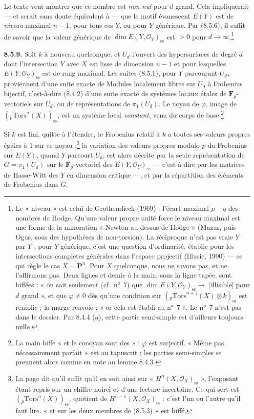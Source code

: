 \documentclass[11pt,a4paper]{article}
\begin{document}
Le texte veut montrer que ce nombre est \emph{non nul} pour $d$ grand. Cela
impliquerait --- et serait sans doute équivalent à --- que le motif
évanescent $E(Y)$ est de \emph{niveau} maximal $n - 1$, pour tous ces $Y$, ou
pour $Y$ générique. Par (8.5.6), il suffit de savoir que la valeur générique
de $\dim E(Y, \mathcal{O}_{Y})_{\mathrm{ss}}$ est $> 0$ pour $d \to
\infty$.\footnote{Le « niveau » est celui de Grothendieck (1969) : l'écart
maximal $p - q$ des nombres de Hodge. Qu'une valeur propre unité force le
niveau maximal est une forme de la minoration « Newton au-dessus de Hodge »
(Mazur, puis Ogus, sous des hypothèses de non-torsion). La réciproque n'est
pas vraie $Y$ par $Y$ ; pour $Y$ générique, c'est une question d'ordinarité,
établie pour les intersections complètes générales dans l'espace projectif
(Illusie, 1990) --- ce qui règle le cas $X = \mathbf{P}^{n}$. Pour $X$
quelconque, nous ne savons pas, et ne l'affirmons pas. Deux lignes et demie à
la main, sous la ligne tapée, sont biffées : « on sait seulement (cf.\ n°~7)
que $\dim E(Y, \mathcal{O}_{Y})_{\mathrm{ss}} \to$ [illisible] pour $d$
grand », et que $\varphi \neq 0$ dès qu'une condition sur
$({}_{p}\mathrm{Tors}^{n+1}(X) \otimes k)_{\mathrm{ss}}$ est remplie ; la
marge renvoie : « or cela est établi au n°~7 ». Le n°~7 n'est pas dans le
dossier. Par 8.4.4 (a), cette partie semi-simple est d'ailleurs toujours
nulle.}

\textbf{8.5.9.} Soit $k$ à nouveau quelconque, et $U_{d}$ l'ouvert des
hypersurfaces de degré $d$ dont l'intersection $Y$ avec $X$ est lisse de
dimension $n - 1$ et pour lesquelles $E(Y, \mathcal{O}_{Y})_{\mathrm{ss}}$
est de rang maximal. Les suites (8.5.1), pour $Y$ parcourant $U_{d}$,
proviennent d'une suite exacte de Modules localement libres sur $U_{d}$ à
Frobenius bijectif, c'est-à-dire (8.4.2) d'une suite exacte de systèmes
locaux étales de $\mathbf{F}_{p}$-vectoriels sur $U_{d}$, ou de
représentations de $\pi_{1}(U_{d})$. Le noyau de $\varphi$, image de
$({}_{p}\mathrm{Tors}^{n}(X))_{\mathrm{ss}}$, est un système local
\emph{constant}, venu du corps de base.\footnote{La main biffe « et le
conoyau sont des » : $\varphi$ est surjectif. « Même pas nécessairement
parfait » est au tapuscrit ; les parties semi-simples se prennent alors comme
en note au lemme 8.4.3.}

Si $k$ est fini, quitte à l'étendre, le Frobenius relatif à $k$ a toutes
ses valeurs propres égales à $1$ sur ce noyau ;\footnote{La page dit qu'il
suffit qu'il en soit ainsi sur « $H^{n}(X, \mathcal{O}_{X})_{\mathrm{ss}}$ »,
l'exposant étant repris sur un chiffre noirci et d'une lecture incertaine. Ce
qui sert est $({}_{p}\mathrm{Tors}^{n}(X))_{\mathrm{ss}}$, quotient de
$H^{n-1}(X, \mathcal{O}_{X})_{\mathrm{ss}}$ ; c'est l'un ou l'autre qu'il faut
lire. « et sur les deux membres de (8.5.3) » est biffé.} la variation des
valeurs propres modulo $p$ du Frobenius sur $E(Y)$, quand $Y$ parcourt
$U_{d}$, est alors décrite par la seule représentation de $G =
\pi_{1}(U_{d})$ sur le $\mathbf{F}_{p}$-vectoriel des
$E(Y, \mathcal{O}_{Y})_{\mathrm{ss}}$ --- c'est-à-dire par les matrices de
Hasse-Witt des $Y$ en dimension critique ---, et par la répartition des
éléments de Frobenius dans $G$.
\end{document}
